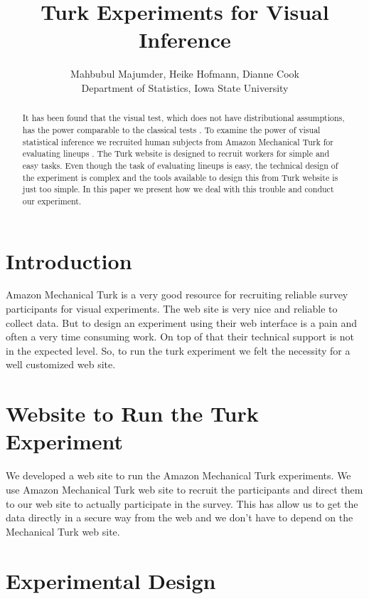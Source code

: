 \documentclass{article}
\title{Turk Experiments for Visual Inference}
\author{Mahbubul Majumder, Heike Hofmann, Dianne Cook\\
        Department of Statistics, Iowa State University}
\begin{document}
\maketitle


\begin {abstract} 

It has been found that the visual test, which does not have distributional assumptions, has the power comparable to the classical
tests \cite{Majumder:2011}. To examine the power of visual statistical inference we recruited human subjects from Amazon Mechanical Turk \cite{turk} for evaluating lineups \cite{buja:2009, Majumder:2011}. The Turk website is designed to recruit workers for simple and easy tasks. Even though the task of evaluating lineups is easy, the technical design of the experiment is complex and the tools available to design this from Turk website is just too simple. In this paper we present how we deal with this trouble and conduct our experiment.

\end {abstract}


\section{Introduction} 

Amazon Mechanical Turk is a very good resource for recruiting reliable survey participants for visual experiments. The web site is very nice and reliable to collect data. But to design an experiment using their web interface is a pain and often a very time consuming work. On top of that their technical support is not in the expected level. So, to run the turk experiment we felt the necessity for a well customized web site.

\section{Website to Run the Turk Experiment} We developed a web site to run the Amazon Mechanical Turk experiments. We use  Amazon Mechanical Turk web site to recruit the participants and direct them to our web site to actually participate in the survey. This has allow us to get the data directly in a secure way from the web and we don't have to depend on the Mechanical Turk web site. 

\section{Experimental Design} \label{sec:exp_design}
\end{document}
